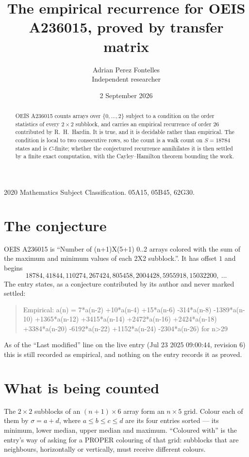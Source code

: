 \documentclass[11pt,a4paper]{article}
\title{The empirical recurrence for OEIS A236015, proved by transfer matrix}
\author{Adrian Perez Fontelles\\ \small Independent researcher}
\date{2 September 2026}
\theoremstyle{plain}
\theoremstyle{definition}
\begin{document}
\maketitle

\begin{abstract}
OEIS A236015 counts arrays over $\{0,\dots,2\}$ subject to a condition on the order
statistics of every $2\times2$ subblock, and carries an empirical recurrence of order
$26$ contributed by R.~H.~Hardin. It is true, and it is decidable rather than empirical.
The condition is local to two consecutive rows, so the count is a walk count on $S=18784$
states and is $C$-finite; whether the conjectured recurrence annihilates it is then settled by
a finite exact computation, with the Cayley--Hamilton theorem bounding the work.
\end{abstract}

\noindent\small 2020 Mathematics Subject Classification. 05A15, 05B45, 62G30.\normalsize

\section{The conjecture}

OEIS A236015 is ``Number of (n+1)X(5+1) 0..2 arrays colored with the sum of the maximum and minimum values of each 2X2 subblock.''. It has offset $1$ and begins
\[
18784, 41844, 110274, 267424, 805458, 2004428, 5955918, 15032200,\ \dots
\]
The entry states, as a conjecture contributed by its author and never marked settled:
\begin{quote}
Empirical: a(n) = 7*a(n-2) +10*a(n-4) +15*a(n-6) -314*a(n-8) -1389*a(n-10) +1365*a(n-12) +3415*a(n-14) +2472*a(n-16) +2424*a(n-18) +3384*a(n-20) -6192*a(n-22) +1152*a(n-24) -2304*a(n-26) for n>29
\end{quote}
As of the ``Last modified'' line on the live entry (Jul 23 2025 09:00:44, revision 6) this is still
recorded as empirical, and nothing on the entry records it as proved.

\section{What is being counted}

The $2\times2$ subblocks of an $(n+1)\times6$ array form an
$n\times5$ grid. Colour each of them by $\sigma=a+d$, where $a\le b\le c\le d$ are its four entries sorted --- its minimum, lower median, upper median and maximum. ``Coloured with'' is the entry's way of
asking for a PROPER colouring of that grid: subblocks that are neighbours, horizontally or
vertically, must receive different colours.
\end{document}
